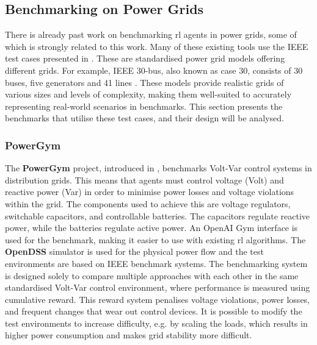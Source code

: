 \subsection{Benchmarking on Power Grids}\label{ssec:power-benchmark}
There is already past work on benchmarking \ac{rl} agents in power grids, some of which is strongly related to this work. Many of these existing tools use the IEEE test cases presented in \citet{matpower}. These are standardised power grid models offering different grids. For example, IEEE 30-bus, also known as case 30, consists of 30 buses, five generators and 41 lines \cite{matpower}. These models provide realistic grids of various sizes and levels of complexity, making them well-suited to accurately representing real-world scenarios in benchmarks. This section presents the benchmarks that utilise these test cases, and their design will be analysed. 

\subsubsection{PowerGym}
The \textbf{PowerGym} project, introduced in \citet{fan2022powergym}, benchmarks Volt-Var control systems in distribution grids. This means that agents must control voltage (Volt) and reactive power (Var) in order to minimise power losses and voltage violations within the grid. The components used to achieve this are voltage regulators, switchable capacitors, and controllable batteries. The capacitors regulate reactive power, while the batteries regulate active power.
An OpenAI Gym interface is used for the benchmark, making it easier to use with existing \ac{rl} algorithms. The \textbf{OpenDSS} simulator is used for the physical power flow and the test environments are based on IEEE benchmark systems. The benchmarking system is designed solely to compare multiple approaches with each other in the same standardised Volt-Var control environment, where performance is measured using cumulative reward. This reward system penalises voltage violations, power losses, and frequent changes that wear out control devices. It is possible to modify the test environments to increase difficulty, e.g. by scaling the loads, which results in higher power consumption and makes grid stability more difficult.

